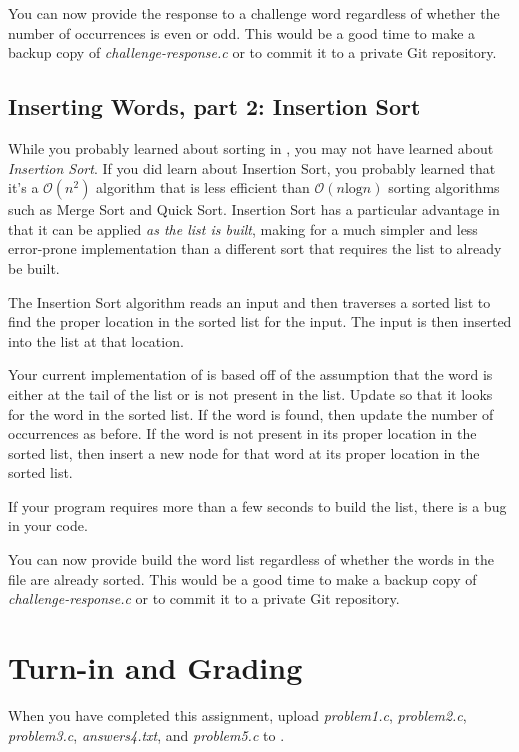 You can now provide the response to a challenge word regardless of whether the
number of occurrences is even or odd. This would be a good time to make a
backup copy of \textit{challenge-response.c} or to commit it to a private Git
repository.

\subsection{Inserting Words, part 2: Insertion Sort}\label{sec:InsertionSort}

While you probably learned about sorting in \cstwo, you may not have learned
about \textit{Insertion Sort}. If you did learn about Insertion Sort, you
probably learned that it's a $\mathcal{O}(n^2)$ algorithm that is less
efficient than $\mathcal{O}(n\mathrm{log}n)$ sorting algorithms such as
Merge Sort and Quick Sort. Insertion Sort has a particular advantage in that it
can be applied \textit{as the list is built}, making for a much simpler and
less error-prone implementation than a different sort that requires the list to
already be built.

The Insertion Sort algorithm reads an input and then traverses a sorted list to
find the proper location in the sorted list for the input. The input is then
inserted into the list at that location.

Your current implementation of  is based off of the
assumption that the word is either at the tail of the list or is not present in
the list. Update  so that it looks for the word in the
sorted list. If the word is found, then update the number of occurrences as
before. If the word is not present in its proper location in the sorted list,
then insert a new node for that word at its proper location in the sorted list.

If your program requires more than a few seconds to build the list, there is a
bug in your code.

You can now provide build the word list regardless of whether the words in the
file are already sorted. This would be a good time to make a backup copy of
\textit{challenge-response.c} or to commit it to a private Git repository.

\section*{Turn-in and Grading}

When you have completed this assignment, upload \textit{problem1.c},
\textit{problem2.c}, \textit{problem3.c}, \textit{answers4.txt}, and
\textit{problem5.c} to \filesubmission.

